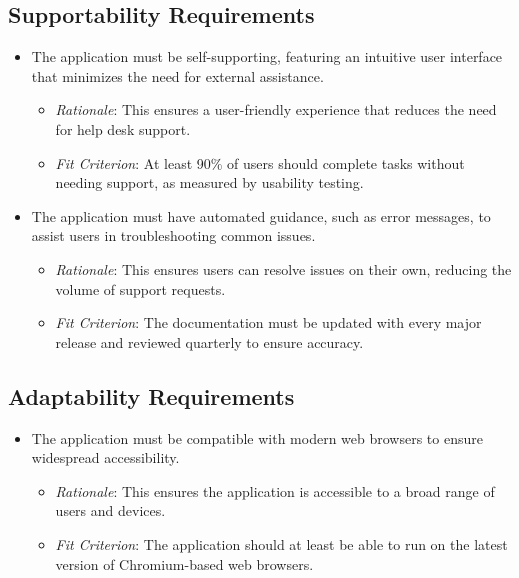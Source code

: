 \documentclass[12pt]{article}
\begin{document}
\subsection{Supportability Requirements}
\begin{itemize}
    \item The application must be self-supporting, featuring an intuitive user
    interface that minimizes the need for external assistance.
    \begin{itemize}
        \item \textit{Rationale}: This ensures a user-friendly experience that
        reduces the need for help desk support.
        \item \textit{Fit Criterion}: At least 90\% of users should complete
        tasks without needing support, as measured by usability testing.
    \end{itemize}
    
    \item The application must have automated guidance, such as error messages,
    to assist users in troubleshooting common issues.
    \begin{itemize}
        \item \textit{Rationale}: This ensures users can resolve issues on their
        own, reducing the volume of support requests.
        \item \textit{Fit Criterion}: The documentation must be updated with
        every major release and reviewed quarterly to ensure accuracy.
    \end{itemize}
\end{itemize}

\subsection{Adaptability Requirements}
\begin{itemize}
    \item The application must be compatible with modern web browsers to ensure
    widespread accessibility.
    \begin{itemize}
        \item \textit{Rationale}: This ensures the application is accessible to
        a broad range of users and devices.
        \item \textit{Fit Criterion}: The application should at least be able to
        run on the latest version of Chromium-based web browsers.
    \end{itemize}
\end{itemize}
\end{document}
